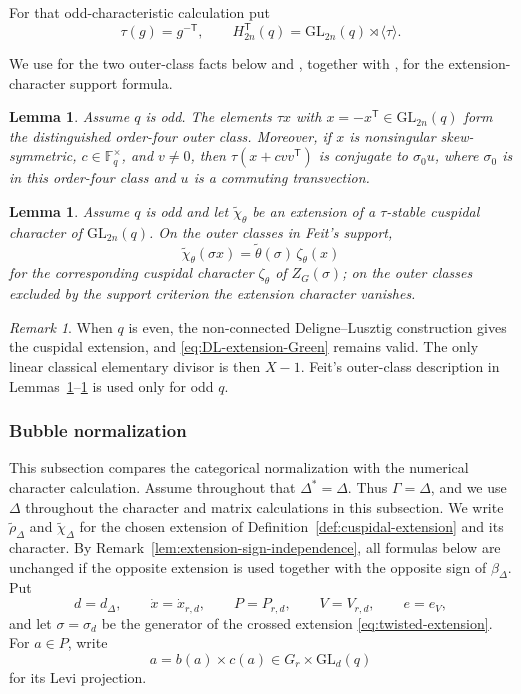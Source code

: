 \documentclass[12pt]{amsart}
\numberwithin{itemcounter}{subsection}
\theoremstyle{plain}
\newtheorem{lemma}[theorem]{Lemma}
\theoremstyle{definition}
\theoremstyle{remark}
\newtheorem{remark}[theorem]{Remark}
\numberwithin{equation}{section}
\def\GL{\mathrm{GL}}
\begin{document}
For that odd-characteristic calculation put
\[
 \tau(g)=g^{-\mathsf T},\qquad
 H_{2n}^{\mathsf T}(q)=\GL_{2n}(q)\rtimes\langle\tau\rangle.
\]

We use \cite[Lemmas~3E(ii) and~3F]{Feit} for the two outer-class facts below and \cite[Theorem~10J]{Feit}, together with \cite{Shu22}, for the extension-character support formula.

\begin{lemma}\label{3E}
Assume \(q\) is odd.  The elements \(\tau x\) with
\(x=-x^{\mathsf T}\in\GL_{2n}(q)\) form the distinguished order-four
outer class.  Moreover, if \(x\) is nonsingular skew-symmetric,
\(c\in\mathbb F_q^\times\), and \(v\ne0\), then
\(\tau(x+cvv^{\mathsf T})\) is conjugate to \(\sigma_0u\), where
\(\sigma_0\) is in this order-four class and \(u\) is a commuting
transvection.
\end{lemma}

\begin{lemma}\label{thm:ext}
Assume \(q\) is odd and let \(\widetilde\chi_\theta\) be an extension of a
\(\tau\)-stable cuspidal character of \(\GL_{2n}(q)\).  On the outer
classes in Feit's support,
\[
 \widetilde\chi_\theta(\sigma x)
   =\widetilde\theta(\sigma)\,\zeta_\theta(x)
\]
for the corresponding cuspidal character \(\zeta_\theta\) of
\(Z_G(\sigma)\); on the outer classes excluded by the support criterion the
extension character vanishes.
\end{lemma}

\begin{remark}
When \(q\) is even, the non-connected Deligne--Lusztig construction gives the
cuspidal extension, and \eqref{eq:DL-extension-Green} remains valid.  The only linear classical elementary divisor is then \(X-1\).  Feit's outer-class
description in Lemmas~\ref{3E}--\ref{thm:ext} is used only for odd $q$.
\end{remark}

\subsubsection{Bubble normalization}
\label{sec:normalization}

This subsection compares the categorical normalization with the numerical
character calculation.  Assume throughout that $\Delta^*=\Delta$.
Thus $\Gamma=\Delta$, and we use $\Delta$ throughout the character and matrix calculations in this subsection.
We write $\widetilde\rho_\Delta$ and $\widetilde\chi_\Delta$ for the
chosen extension of Definition~\ref{def:cuspidal-extension} and its
character.  By Remark~\ref{lem:extension-sign-independence}, all formulas
below are unchanged if the opposite extension is used together with the
opposite sign of $\beta_\Delta$.  Put
\[
d=d_\Delta,\qquad
\dot{x}=\dot{x}_{r,d},\qquad
P=P_{r,d},\qquad
V=V_{r,d},\qquad e=e_V,
\]
and let $\sigma=\sigma_d$ be the generator of the crossed extension
\eqref{eq:twisted-extension}.  For $a\in P$, write
\[
a=b(a)\times c(a)\in G_r\times\GL_d(q)
\]
for its Levi projection.
\end{document}
